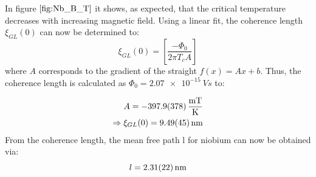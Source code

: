 In figure $\autoref{fig:Nb_B_T}$ it shows, as expected, that the critical temperature decreases with increasing magnetic field. Using a linear fit, the coherence length $\xi_{GL}(0)$ can now be determined to:
\begin{equation}
    \xi_{GL}(0)= \left[ \frac{-\Phi_0}{2\pi T_cA} \right]
\end{equation}
where $A$ corresponds to the gradient of the straight $f(x) = Ax+b$.  Thus, the coherence length is calculated as $\Phi_0 = \SI{2.07e-15}{Vs} $ to:

\begin{align*}
    A = \SI{-397,9\pm37,8 }{\frac{mT}{K}} \\
    \Rightarrow \xi_{GL}(0)= \SI{9,49\pm0,45}{nm} \\
\end{align*}
From the coherence length, the mean free path l for niobium can now be obtained via:
\begin{equation}
    l = \SI{2,31\pm0,22}{nm}
\end{equation}